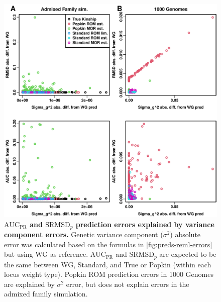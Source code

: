 \documentclass[11pt]{article}
\newcommand{\rmsd}{\text{SRMSD}_p}
\newcommand{\auc}{\text{AUC}_\text{PR}}
\begin{document}
\begin{figure}[bp!]
  \centering
  \includegraphics[width=\textwidth]{reml-err-vs-pred-err.pdf}
  \caption{
    {\bf $\auc$ and $\rmsd$ prediction errors explained by variance component errors.}
    Genetic variance component ($\sigma^2$) absolute error was calculated based on the formulas in \cref{fig:preds-reml-errors} but using WG as reference.
    $\auc$ and $\rmsd$ are expected to be the same between WG, Standard, and True or Popkin (within each locus weight type).
    Popkin ROM prediction errors in 1000 Genomes are explained by $\sigma^2$ error, but does not explain errors in the admixed family simulation.
  }
  \label{fig:reml-err-vs-pred-err}
\end{figure}
\end{document}
